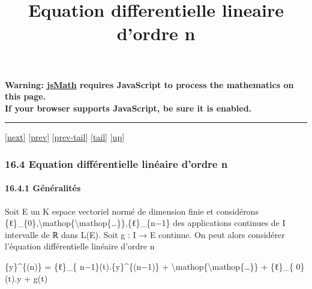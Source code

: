 \documentclass[]{article}
\title{Equation differentielle lineaire d'ordre n}
\author{}
\date{}
\begin{document}
\maketitle

\textbf{Warning: \href{http://www.math.union.edu/locate/jsMath}{jsMath}
requires JavaScript to process the mathematics on this page.\\ If your
browser supports JavaScript, be sure it is enabled.}

\begin{center}\rule{3in}{0.4pt}\end{center}

{[}\href{coursse90.html}{next}{]} {[}\href{coursse88.html}{prev}{]}
{[}\href{coursse88.html\#tailcoursse88.html}{prev-tail}{]}
{[}\hyperref[tailcoursse89.html]{tail}{]}
{[}\href{coursch17.html\#coursse89.html}{up}{]}

\subsubsection{16.4 Equation différentielle linéaire d'ordre n}

\paragraph{16.4.1 Généralités}

Soit E un K espace vectoriel normé de dimension finie et considérons
\{ℓ\}\_\{0\},\textbackslash{}mathop\{\textbackslash{}mathop\{\ldots{}\}\},\{ℓ\}\_\{n−1\}
des applications continues de I intervalle de ℝ dans L(E). Soit g : I →
E continue. On peut alors considérer l'équation différentielle linéaire
d'ordre n

\{y\}\^{}\{(n)\} = \{ℓ\}\_\{ n−1\}(t).\{y\}\^{}\{(n−1)\} +
\textbackslash{}mathop\{\textbackslash{}mathop\{\ldots{}\}\} + \{ℓ\}\_\{
0\}(t).y + g(t)
\end{document}
